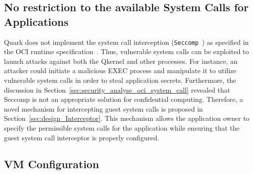 
\subsection{No restriction to the available System Calls for Applications}

Quark does not implement the system call interception (\texttt{Seccomp}~\cite*{seccomp}) as specified in the OCI runtime specification~\cite*{oci-runtime-spec}. Thus, vulnerable system calls can be exploited to launch attacks against both the Qkernel and other processes. For instance, an attacker could initiate a malicious EXEC process and manipulate it 
to utilize vulnerable system calls in order to steal application secrets. Furthermore, the discussion in Section~\ref{sec:security_analyse_oci_system_call} revealed that Seccomp is not an appropriate solution for confidential computing. Therefore, a novel mechanism for intercepting guest system calls is proposed in Section~\ref{sec:design_Interceptor}. This mechanism allows the 
application owner to specify the permissible system calls for the application while ensuring that the guest system call interceptor is properly configured. 




\subsection{VM Configuration}
\label{sec:VM_Misconfiguration}

